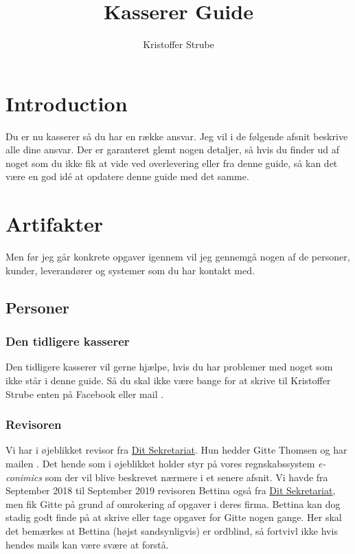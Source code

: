 

\title{Kasserer Guide}                        %
\date{}
\author{Kristoffer Strube}                       %



\maketitle

\tableofcontents

\clearpage

\section{Introduction}
Du er nu kasserer så du har en række ansvar. Jeg vil i de følgende afsnit beskrive alle dine ansvar. Der er garanteret glemt nogen detaljer, så hvis du finder ud af noget som du ikke fik at vide ved overlevering eller fra denne guide, så kan det være en god idé at opdatere denne guide med det samme.

\section{Artifakter}
Men før jeg går konkrete opgaver igennem vil jeg gennemgå nogen af de personer, kunder, leverandører og systemer som du har kontakt med.
\subsection{Personer}
\subsubsection{Den tidligere kasserer}
Den tidligere kasserer vil gerne hjælpe, hvis du har problemer med noget som ikke står i denne guide. Så du skal ikke være bange for at skrive til Kristoffer Strube enten på Facebook eller mail .
\subsubsection{Revisoren}
Vi har i øjeblikket revisor fra \href{https://www.sekr.dk/}{Dit Sekretariat}. Hun hedder Gitte Thomsen og har mailen . Det hende som i øjeblikket holder styr på vores regnskabssystem \textit{e-conimics} som der vil blive beskrevet nærmere i et senere afsnit. Vi havde fra September 2018 til September 2019 revisoren Bettina også fra \href{https://www.sekr.dk/}{Dit Sekretariat}, men fik Gitte på grund af omrokering af opgaver i deres firma. Bettina kan dog stadig godt finde på at skrive eller tage opgaver for Gitte nogen gange. Her skal det bemærkes at Bettina (højst sandsynligvis) er ordblind, så fortvivl ikke hvis hendes mails kan være svære at forstå.
